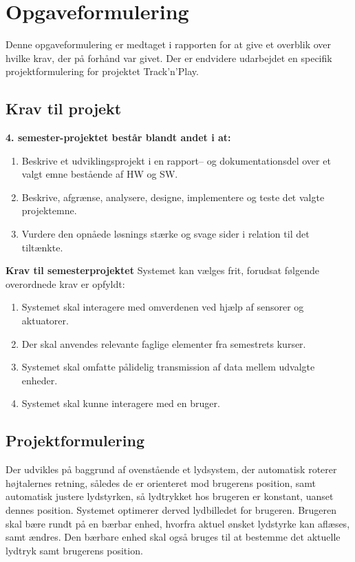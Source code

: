 \chapter{Opgaveformulering}
\label{chap:opgaveformulering}

Denne opgaveformulering er medtaget i rapporten for at give et overblik over hvilke krav, der på forhånd var givet. Der er endvidere udarbejdet en specifik projektformulering for projektet Track’n’Play.


\section{Krav til projekt}
\textbf{4. semester-projektet består blandt andet i at:}
\begin{enumerate}
\item Beskrive et udviklingsprojekt i en rapport– og dokumentationsdel over et valgt emne bestående af HW og SW. 
\item Beskrive, afgrænse, analysere, designe, implementere og teste det valgte projektemne.
\item Vurdere den opnåede løsnings stærke og svage sider i relation til det tiltænkte.
\end{enumerate}\medskip

\textbf{Krav til semesterprojektet}
Systemet kan vælges frit, forudsat følgende overordnede krav er opfyldt:
\begin{enumerate}
\item Systemet skal interagere med omverdenen ved hjælp af sensorer og aktuatorer.
\item Der skal anvendes relevante faglige elementer fra semestrets kurser.
\item Systemet skal omfatte pålidelig transmission af data mellem udvalgte enheder.
\item Systemet skal kunne interagere med en bruger.
\end{enumerate}\medskip 


\section{Projektformulering}
Der udvikles på baggrund af ovenstående et lydsystem, der automatisk roterer højtalernes retning, således de er orienteret mod brugerens position, samt automatisk justere lydstyrken, så lydtrykket hos brugeren er konstant, uanset dennes position. Systemet optimerer derved lydbilledet for brugeren.\newline
Brugeren skal bære rundt på en bærbar enhed, hvorfra aktuel ønsket lydstyrke kan aflæses, samt ændres. Den bærbare enhed skal også bruges til at bestemme det aktuelle lydtryk samt brugerens position.

